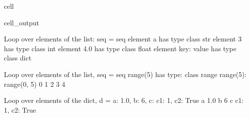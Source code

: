 \documentclass[letterpaper,10pt,italian]{jupyterBook}
\begin{document}
\begin{sphinxuseclass}{cell}
\begin{sphinxVerbatimOutput}
\begin{sphinxuseclass}{cell_output}
\begin{sphinxVerbatim}[commandchars=\\\{\}]
Loop over elements of the list: seq = \PYGZob{}seq\PYGZcb{}
element a has type \PYGZlt{}class \PYGZsq{}str\PYGZsq{}\PYGZgt{}
element 3 has type \PYGZlt{}class \PYGZsq{}int\PYGZsq{}\PYGZgt{}
element 4.0 has type \PYGZlt{}class \PYGZsq{}float\PYGZsq{}\PYGZgt{}
element \PYGZob{}\PYGZsq{}key\PYGZsq{}: \PYGZsq{}value\PYGZsq{}\PYGZcb{} has type \PYGZlt{}class \PYGZsq{}dict\PYGZsq{}\PYGZgt{}

Loop over elements of the list, seq = \PYGZob{}seq\PYGZcb{}
range(5) has type: \PYGZlt{}class \PYGZsq{}range\PYGZsq{}\PYGZgt{}
range(5): range(0, 5)
0
1
2
3
4

Loop over elements of the dict, d = \PYGZob{}\PYGZsq{}a\PYGZsq{}: 1.0, \PYGZsq{}b\PYGZsq{}: 6, \PYGZsq{}c\PYGZsq{}: \PYGZob{}\PYGZsq{}c1\PYGZsq{}: 1, \PYGZsq{}c2\PYGZsq{}: True\PYGZcb{}\PYGZcb{}
a 1.0
b 6
c \PYGZob{}\PYGZsq{}c1\PYGZsq{}: 1, \PYGZsq{}c2\PYGZsq{}: True\PYGZcb{}
\end{sphinxVerbatim}

\end{sphinxuseclass}\end{sphinxVerbatimOutput}

\end{sphinxuseclass}
\end{document}
